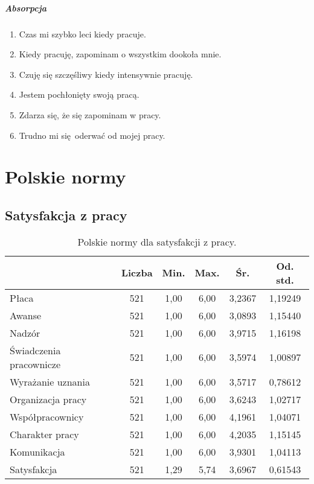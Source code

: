 \paragraph{Absorpcja}
\begin{enumerate}
  \item Czas mi szybko leci kiedy pracuje.
  \item Kiedy pracuję, zapominam o wszystkim dookoła mnie.
  \item Czuję się szczęśliwy kiedy intensywnie pracuję.
  \item Jestem pochłonięty swoją pracą.
  \item Zdarza się, że się zapominam w pracy.
  \item Trudno mi się oderwać od mojej pracy.
\end{enumerate}
\cleardoublepage
\chapter{Polskie normy}
\section{Satysfakcja z pracy}
\label{sec:app-jss-norms}

\begin{table}[h!]
\begin{center}
\begin{tabular}{l | c c c c c}
  & Liczba & Min. & Max. & Śr. & Od. std. \\ \hline
Płaca & 521 & 1,00 & 6,00 & 3,2367 & 1,19249 \\
Awanse & 521 & 1,00 & 6,00 & 3,0893 & 1,15440 \\ 
Nadzór &  521 & 1,00 & 6,00 & 3,9715 & 1,16198 \\
Świadczenia pracownicze &  521 & 1,00 & 6,00 & 3,5974 & 1,00897 \\
Wyrażanie uznania &  521 & 1,00 & 6,00 & 3,5717 & 0,78612 \\
Organizacja pracy &  521 & 1,00 & 6,00 & 3,6243 & 1,02717 \\
Współpracownicy &  521 & 1,00 & 6,00 & 4,1961 & 1,04071 \\
Charakter pracy &  521 & 1,00 & 6,00 & 4,2035 & 1,15145 \\
Komunikacja & 521 & 1,00 & 6,00 & 3,9301 & 1,04113 \\ \hline
Satysfakcja & 521 & 1,29 & 5,74 & 3,6967 & 0,61543 \\
\end{tabular}
\end{center}
\caption{Polskie normy dla satysfakcji z pracy.}
\label{tab:jss-pl-norms}
\end{table}

